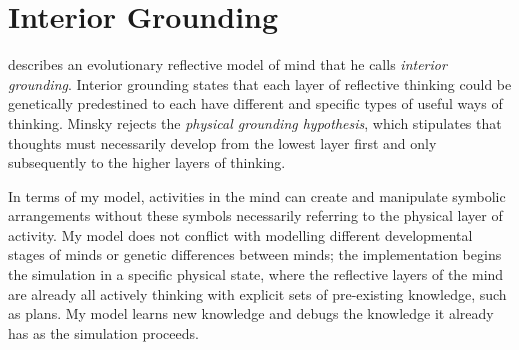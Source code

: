 \section{Interior Grounding}

\cite{minsky:2005} describes an evolutionary reflective model of mind
that he calls \emph{interior grounding}.  Interior grounding states
that each layer of reflective thinking could be genetically
predestined to each have different and specific types of useful ways
of thinking.  Minsky rejects the \emph{physical grounding hypothesis},
which stipulates that thoughts must necessarily develop from the
lowest layer first and only subsequently to the higher layers of
thinking.

In terms of my model, activities in the mind can create and manipulate
symbolic arrangements without these symbols necessarily referring to
the physical layer of activity.  My model does not conflict with
modelling different developmental stages of minds or genetic
differences between minds; the implementation begins the simulation in
a specific physical state, where the reflective layers of the mind are
already all actively thinking with explicit sets of pre-existing
knowledge, such as plans.  My model learns new knowledge and debugs
the knowledge it already has as the simulation proceeds.

